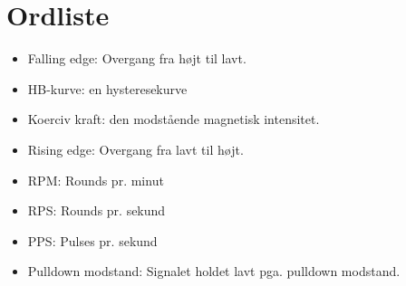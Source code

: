 \section{Ordliste}
\label{ordliste}
\begin{itemize}
\item Falling edge: Overgang fra højt til lavt.
\item HB-kurve: en hysteresekurve
\item Koerciv kraft: den modstående magnetisk intensitet.
\item Rising edge: Overgang fra lavt til højt.
\item RPM: Rounds pr. minut
\item RPS: Rounds pr. sekund 
\item PPS: Pulses pr. sekund
\item Pulldown modstand: Signalet holdet lavt pga. pulldown modstand. 
\end{itemize}
